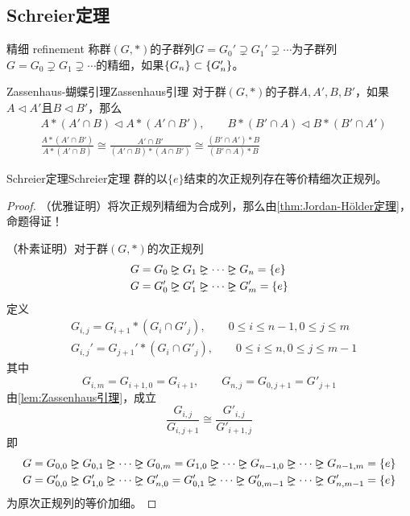 \subsection{Schreier定理}

\begin{definition}{精细 refinement}
	称群$(G,*)$的子群列$G=G_0'\supsetneq G_1'\supsetneq \cdots$为子群列$G=G_0\supsetneq G_1\supsetneq \cdots$的精细，如果$\{ G_n \}\subset \{G_n'\}$。
\end{definition}

\begin{lemma}{Zassenhaus-蝴蝶引理}{Zassenhaus引理}
	对于群$(G,*)$的子群$A,A',B,B'$，如果$A\lhd A'$且$B\lhd B'$，那么
	\begin{align*}
		&A*(A'\cap B)\lhd A*(A'\cap B'),\qquad
		B*(B'\cap A)\lhd B*(B'\cap A')\\
		&\frac{A*(A'\cap B')}{A*(A'\cap B)}\cong
		\frac{A'\cap B'}{(A'\cap B)*(A\cap B')}\cong
		\frac{(B'\cap A')*B}{(B'\cap A)*B}
	\end{align*}
\end{lemma}

\begin{theorem}{Schreier定理}{Schreier定理}
	群的以$\{e\}$结束的次正规列存在等价精细次正规列。
\end{theorem}

\begin{proof}
	（优雅证明）将次正规列精细为合成列，那么由\ref{thm:Jordan-Hölder定理}，命题得证！
	
	（朴素证明）对于群$(G,*)$的次正规列
	\begin{align*}
		&G=G_0\rhdneq  G_1 \rhdneq  \cdots \rhdneq   G_n=\{e\}\\
		&G=G_0'\rhdneq  G_1' \rhdneq  \cdots \rhdneq   G_m'=\{e\}
	\end{align*}
	定义
	\begin{align*}
		&G_{i,j}=G_{i+1}*(G_i\cap G'_j),\qquad 0\le i\le n-1,0\le j\le m\\ 
		&G_{i,j}'=G_{j+1}'*(G_i\cap G'_j),\qquad 0\le i\le n,0\le j\le m-1
	\end{align*}
	其中
	$$
	G_{i,m}=G_{i+1,0}=G_{i+1},\qquad 
	G_{n,j}=G_{0,j+1}=G'_{j+1}
	$$
	由\ref{lem:Zassenhaus引理}，成立
	$$
	\frac{G_{i,j}}{G_{i,j+1}}\cong\frac{G'_{i,j}}{G'_{i+1,j}}
	$$
	即
	\begin{align*}
		&G=G_{0,0}\rhdneq  G_{0,1}\rhdneq  \cdots \rhdneq G_{0,m}=G_{1,0}\rhdneq \cdots \rhdneq  G_{n-1,0}\rhdneq  \cdots \rhdneq  G_{n-1,m}=\{e\}\\
		&G=G'_{0,0}\rhdneq  G'_{1,0}\rhdneq  \cdots \rhdneq  G'_{n,0}=G'_{0,1}\rhdneq \cdots \rhdneq  G'_{0,m-1}\rhdneq \cdots \rhdneq  G'_{n,m-1}=\{e\}
	\end{align*}
	为原次正规列的等价加细。
\end{proof}


